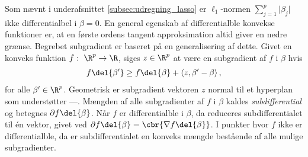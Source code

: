Som nævnt i underafsnittet \ref{subsec:udregning_lasso} er \(\ell_1\)-normen \(\sum_{j=1}^p \vert \beta_j \vert\) ikke differentialbel i \(\beta = 0\).
En general egenskab af differentialble konvekse funktioner er, at en første ordens tangent approksimation altid giver en nedre grænse.
Begrebet subgradient er baseret på en generalisering af dette.
Givet en konveks funktion \(f: \ \R^p \rightarrow \R\), siges \(z \in \R^p\) at være en subgradient af \(f\) i \(\beta\) hvis
\begin{align*}
f \del{\beta'} \geq f \del{\beta} + \left\langle z, \beta' - \beta \right\rangle, 
\end{align*}
for alle \(\beta' \in \R^p\).
Geometrisk er subgradient vektoren \(z\) normal til et hyperplan som understøtter ---.
Mængden af alle subgradienter af \(f\) i \(\beta\) kaldes \textit{subdifferential} og betegnes \(\partial f \del{\beta}\).
Når \(f\) er differentialble i \(\beta\), da reduceres subdifferentialet til én vektor, givet ved \(\partial f \del{\beta} = \cbr{\nabla f \del{\beta}}\).
I punkter hvor \(f\) ikke er differentialble, da er subdifferentialet en konveks mængde bestående af alle mulige subgradienter.







